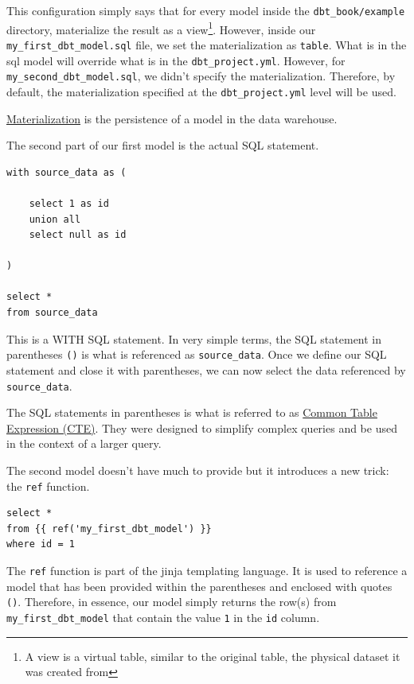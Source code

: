 \documentclass[
]{book}
\begin{document}
This configuration simply says that for every model inside the \texttt{dbt\_book/example} directory, materialize the result as a view\footnote{A view is a virtual table, similar to the original table, the physical dataset it was created from}. However, inside our \texttt{my\_first\_dbt\_model.sql} file, we set the materialization as \texttt{table}. What is in the sql model will override what is in the \texttt{dbt\_project.yml}. However, for \texttt{my\_second\_dbt\_model.sql}, we didn't specify the materialization. Therefore, by default, the materialization specified at the \texttt{dbt\_project.yml} level will be used.

\href{https://docs.getdbt.com/docs/build/materializations}{Materialization} is the persistence of a model in the data warehouse.

The second part of our first model is the actual SQL statement.

\begin{verbatim}
with source_data as (

    select 1 as id
    union all
    select null as id

)

select *
from source_data
\end{verbatim}

This is a WITH SQL statement. In very simple terms, the SQL statement in parentheses \texttt{()} is what is referenced as \texttt{source\_data}. Once we define our SQL statement and close it with parentheses, we can now select the data referenced by \texttt{source\_data}.

The SQL statements in parentheses is what is referred to as \href{https://www.atlassian.com/data/sql/using-common-table-expressions}{Common Table Expression (CTE)}. They were designed to simplify complex queries and be used in the context of a larger query.

The second model doesn't have much to provide but it introduces a new trick: the \texttt{ref} function.

\begin{verbatim}
select *
from {{ ref('my_first_dbt_model') }}
where id = 1
\end{verbatim}

The \texttt{ref} function is part of the jinja templating language. It is used to reference a model that has been provided within the parentheses and enclosed with quotes \texttt{(\textquotesingle{}\textquotesingle{})}. Therefore, in essence, our model simply returns the row(s) from \texttt{my\_first\_dbt\_model} that contain the value \texttt{1} in the \texttt{id} column.
\end{document}
